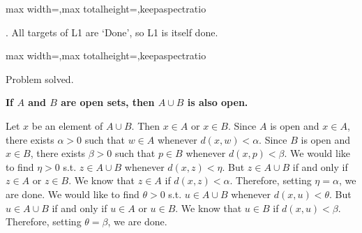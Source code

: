 \documentclass[a4paper,twoside,12pt]{article} %
\makeatletter
\DeclareRobustCommand{\_}{%
  \leavevmode\vbox{%
    \hrule\@width.4em
          \@height-.16ex
          \@depth\dimexpr.16ex+.28pt\relax}}
\newenvironment{fit}{\begin{adjustbox}{max width=\textwidth,max totalheight=\textheight,keepaspectratio}}{\end{adjustbox}}
\makeatother
\begin{document}
\begin{steps}
\begin{fit}
%
\end{fit}
\smallskip

. All targets of L1 are `Done', so L1 is itself done.\nopagebreak[4] 
\marginpar{}\nopagebreak[4] 
\smallskip\nopagebreak[4] 

\begin{fit}%
\end{fit}

Problem solved.
\cleardoublepage

\end{steps}
{\begin{center} \large \textbf{If $A$ and $B$ are open sets, then $A \cup B$ is also open.}\end{center}}\nopagebreak[4]

\begin{center}
\begin{minipage}{120mm}
Let $x$ be an element of $A\cup B$. Then $x\in A$ or $x\in B$. Since $A$ is open and $x\in A$, there exists $\alpha > 0$ such that $w\in A$\textrm{ whenever }$\textit{d}(x,w) < \alpha$. Since $B$ is open and $x\in B$, there exists $\beta > 0$ such that $p\in B$\textrm{ whenever }$\textit{d}(x,p) < \beta$. We would like to find $\eta > 0$ s.t. $z\in A\cup B$\textrm{ whenever }$\textit{d}(x,z) < \eta$. But $z\in A\cup B$ if and only if $z\in A$ or $z\in B$. We know that $z\in A$ if $\textit{d}(x,z) < \alpha$. Therefore, setting $\eta = \alpha$, we are done. We would like to find $\theta > 0$ s.t. $u\in A\cup B$\textrm{ whenever }$\textit{d}(x,u) < \theta$. But $u\in A\cup B$ if and only if $u\in A$ or $u\in B$. We know that $u\in B$ if $\textit{d}(x,u) < \beta$. Therefore, setting $\theta = \beta$, we are done.
\end{minipage}
\end{center}
\end{document}

